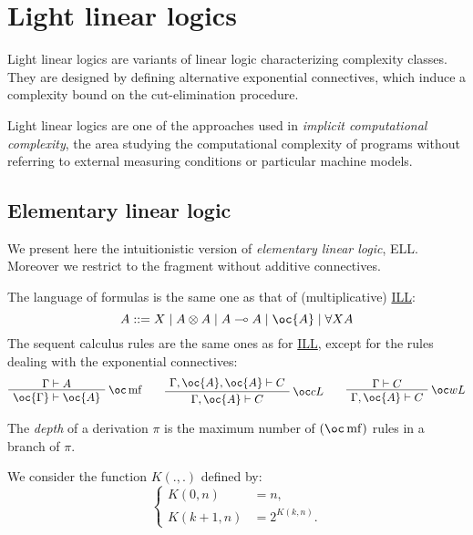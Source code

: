 \chapter{Light linear logics}\label{light-linear-logics}

Light linear logics are variants of linear logic characterizing
complexity classes. They are designed by defining alternative
exponential connectives, which induce a complexity bound on the
cut-elimination procedure.

Light linear logics are one of the approaches used in \emph{implicit
computational complexity}, the area studying the computational
complexity of programs without referring to external measuring
conditions or particular machine models.

\section{Elementary linear logic}\label{elementary-linear-logic}

We present here the intuitionistic version of \emph{elementary linear
logic}, ELL. Moreover we restrict to the fragment without additive
connectives.

The language of formulas is the same one as that of (multiplicative)
\hyperref[intuitionistic-linear-logic]{ILL}:
\begin{equation*}
A ::= X \mid A\tens A \mid A\limp A  \mid \oc{A} \mid \forall X A
\end{equation*}
The sequent calculus rules are the same ones as for
\hyperref[intuitionistic-linear-logic]{ILL}, except for the rules dealing
with the exponential connectives:
\begin{equation*}
\AxRule{\Gamma\vdash A}
\LabelRule{\oc\rulename{mf}}
\UnaRule{\oc{\Gamma}\vdash\oc{A}}
\DisplayProof
\qquad
\AxRule{\Gamma,\oc{A},\oc{A}\vdash C}
\LabelRule{\oc c L}
\UnaRule{\Gamma,\oc{A}\vdash C}
\DisplayProof
\qquad
\AxRule{\Gamma\vdash C}
\LabelRule{\oc w L}
\UnaRule{\Gamma,\oc{A}\vdash C}
\DisplayProof
\end{equation*}

The \emph{depth} of a derivation \(\pi\) is the maximum number of
\((\oc\rulename{mf})\) rules in a branch of \(\pi\).

We consider the function \(K(.,.)\) defined by:
\begin{equation*}
\begin{cases}
K(0,n) &=n,\\
K(k+1,n) &=2^{K(k,n)}.
\end{cases}
\end{equation*}

